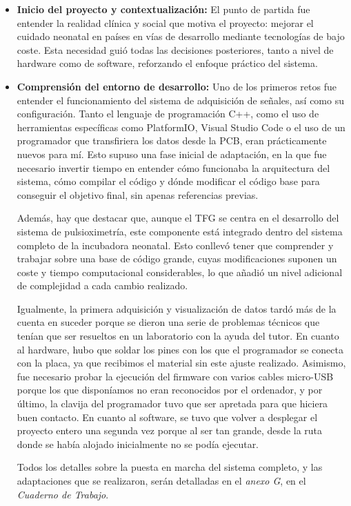 \begin{itemize}
\item \textbf{Inicio del proyecto y contextualización:} El punto de partida fue entender la realidad clínica y social que motiva el proyecto: mejorar el cuidado neonatal en países en vías de desarrollo mediante tecnologías de bajo coste. Esta necesidad guió todas las decisiones posteriores, tanto a nivel de hardware como de software, reforzando el enfoque práctico del sistema.
\item \textbf{Comprensión del entorno de desarrollo:} Uno de los primeros retos fue entender el funcionamiento del sistema de adquisición de señales, así como su configuración. Tanto el lenguaje de programación C++, como el uso de herramientas específicas como PlatformIO, Visual Studio Code o el uso de un programador que transfiriera los datos desde la PCB, eran prácticamente nuevos para mí. Esto supuso una fase inicial de adaptación, en la que fue necesario invertir tiempo en entender cómo funcionaba la arquitectura del sistema, cómo compilar el código y dónde modificar el código base para conseguir el objetivo final, sin apenas referencias previas.

Además, hay que destacar que, aunque el TFG se centra en el desarrollo del sistema de pulsioximetría, este componente está integrado dentro del sistema completo de la incubadora neonatal. Esto conllevó tener que comprender y trabajar sobre una base de código grande, cuyas modificaciones suponen un coste y tiempo computacional considerables, lo que añadió un nivel adicional de complejidad a cada cambio realizado. 

Igualmente, la primera adquisición y visualización de datos tardó más de la cuenta en suceder porque se dieron una serie de problemas técnicos que tenían que ser resueltos en un laboratorio con la ayuda del tutor. En cuanto al hardware, hubo que soldar los pines con los que el programador se conecta con la placa, ya que recibimos el material sin este ajuste realizado. Asimismo, fue necesario probar la ejecución del firmware con varios cables micro-USB porque los que disponíamos no eran reconocidos por el ordenador, y por último, la clavija del programador tuvo que ser apretada para que hiciera buen contacto. En cuanto al software, se tuvo que volver a desplegar el proyecto entero una segunda vez porque al ser tan grande, desde la ruta donde se había alojado inicialmente no se podía ejecutar.

Todos los detalles sobre la puesta en marcha del sistema completo, y las adaptaciones que se realizaron, serán detalladas en el \textit{anexo G}, en el \textit{Cuaderno de Trabajo}.


\end{itemize}
